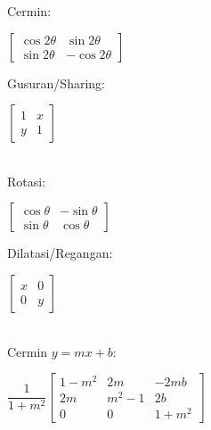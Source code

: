 \begin{large}
  Cermin:
  \begin{Large}
    $\begin{bmatrix}
      \cos2\theta &  \sin2\theta \\
      \sin2\theta & -\cos2\theta
    \end{bmatrix}$
  \end{Large}
  \hfill
  Gusuran/Sharing:
  \begin{Large}
    $\begin{bmatrix}
      1 & x \\
      y & 1
    \end{bmatrix}$
  \end{Large} \\

  Rotasi:
  \begin{Large}
    $\begin{bmatrix}
      \cos\theta & -\sin\theta \\
      \sin\theta &  \cos\theta
    \end{bmatrix}$
  \end{Large}
  \hfill
  Dilatasi/Regangan:
  \begin{Large}
    $\begin{bmatrix}
      x & 0 \\
      0 & y
    \end{bmatrix}$
  \end{Large} \\

  Cermin $y = mx + b$:
  \begin{huge}
    $\dfrac{1}{1 + m^2} \begin{bmatrix}
      1 - m^2 & 2m & -2mb \\
      2m & m^2 - 1 & 2b \\
      0 & 0 & 1 + m^2
    \end{bmatrix}$
  \end{huge}
\end{large}
